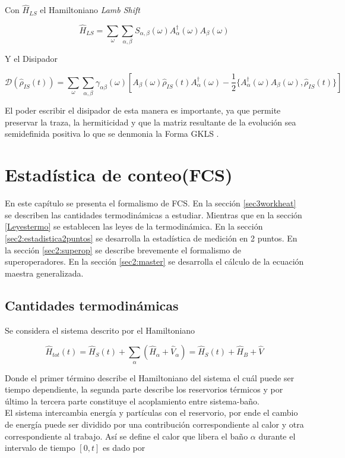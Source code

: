 Con $\hat{H}_{LS}$ el Hamiltoniano \textit{Lamb Shift}

\begin{equation*}
    \hat{H}_{LS} = \sum_{\omega} \sum_{\alpha,\beta} S_{\alpha,\beta}(\omega)A^{\dagger}_{\alpha}(\omega)A_{\beta}(\omega) 
\end{equation*}

Y el Disipador

\begin{equation*}
    \mathcal{D}(\hat{\rho}_{IS}(t)) = \sum_{\omega}\sum_{\alpha,\beta} \gamma_{\alpha \beta}(\omega) \left[ A_{\beta}(\omega)\hat{\rho}_{IS}(t)A^{\dagger}_{\alpha}(\omega) - \frac{1}{2}\{A^{\dagger}_{\alpha}(\omega)A_{\beta}(\omega), \hat{\rho}_{IS}(t)  \} \right]
\end{equation*}

El poder escribir el disipador de esta manera es importante, ya que permite preservar la traza, la hermiticidad y que la matriz resultante de la evolución sea semidefinida positiva lo que se denmonia la Forma GKLS \cite{manzano2020short}.

\label{sec:lindblad}


\chapter{Estadística de conteo(FCS)}
En este capítulo se presenta el formalismo de FCS. En la sección \ref{sec3workheat} se describen las cantidades termodinámicas a estudiar. Mientras que en la sección \ref{Leyestermo} se establecen las leyes de la termodinámica. En la sección \ref{sec2:estadistica2puntos} se desarrolla la estadística de medición en 2 puntos. En la sección \ref{sec2:superop} se describe brevemente el formalismo de superoperadores. En la sección \ref{sec2:master} se desarrolla el cálculo de la ecuación maestra generalizada. 

\section{Cantidades termodinámicas}
Se considera el sistema descrito por el Hamiltoniano

\begin{equation*}
    \hat{H}_{tot}(t) = \hat{H}_{S}(t) + \sum_{\alpha}(\hat{H}_{\alpha} + \hat{V}_{\alpha})  = \hat{H}_{S}(t) + \hat{H}_{B} + \hat{V}
\end{equation*}

Donde el primer término describe el Hamiltoniano del sistema el cuál puede ser tiempo dependiente, la segunda parte describe los reservorios térmicos y por último la tercera parte constituye el acoplamiento entre sistema-baño.\\
El sistema intercambia energía y partículas con el reservorio, por ende el cambio de energía puede ser dividido por una contribución correspondiente al calor y otra correspondiente al trabajo. Así se define el calor que libera el baño $\alpha$ durante el intervalo de tiempo $[0,t]$ es dado por

